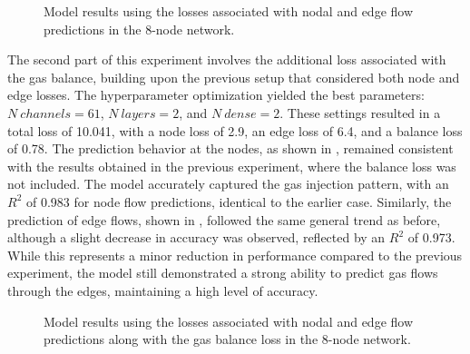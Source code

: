 \begin{figure}[h] 
    \centering
    \setlength{}        
    \setlength{} 
    
    \caption{Model results using the losses associated with nodal and edge flow predictions in the 8-node network.}
    \label{fig:dummy_base_results}
\end{figure}


The second part of this experiment involves the additional loss associated with the gas balance, building upon the previous setup that considered both node and edge losses. The hyperparameter optimization yielded the best parameters: $N \ channels =61$, $N \ layers =2$, and $N \ dense=2$. These settings resulted in a total loss of 10.041, with a node loss of 2.9, an edge loss of 6.4, and a balance loss of 0.78. The prediction behavior at the nodes, as shown in , remained consistent with the results obtained in the previous experiment, where the balance loss was not included. The model accurately captured the gas injection pattern, with an $R^2$ of 0.983 for node flow predictions, identical to the earlier case. Similarly, the prediction of edge flows, shown in , followed the same general trend as before, although a slight decrease in accuracy was observed, reflected by an $R^2$ of 0.973. While this represents a minor reduction in performance compared to the previous experiment, the model still demonstrated a strong ability to predict gas flows through the edges, maintaining a high level of accuracy.

\begin{figure}[h]
    \centering
    \setlength{}        
    \setlength{} 
    \caption{Model results using the losses associated with nodal and edge flow predictions along with the gas balance loss in the 8-node network.}
    \label{fig:dummy_base_results}
\end{figure}


